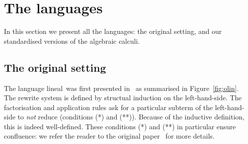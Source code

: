 \documentclass{LMCS}
\newcommand{\olin}{\mbox{\sc lineal}}
\begin{document}
\section{The languages}
In this section we present all the languages: the original setting, and our standardised versions of the algebraic calculi.
\subsection{The original setting}\label{sec:originals}
The language \olin\ was first presented in~\cite{ArrighiDowekRTA08} as
summarised in Figure~\ref{fig:olin}. The rewrite system is defined by
structual induction on the left-hand-side. The factorisation and
application rules ask for a particular subterm of the left-hand-side
to {\em not} reduce (conditions (*) and (**)). Because of the
inductive definition, this is indeed well-defined.
These conditions (*) and (**) in particular ensure confluence: we
refer the reader to the original paper~\cite{ArrighiDowekRTA08} for
more details.
\end{document}
